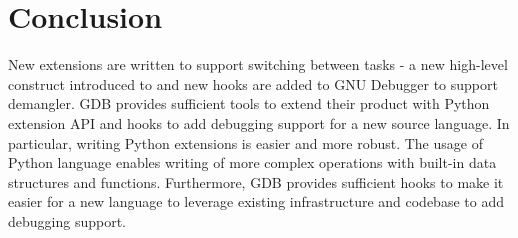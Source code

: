 \chapter{Conclusion}
New extensions are written to support switching between tasks - a new
high-level construct introduced to \uCPP and new hooks are added to GNU
Debugger to support \CFAS demangler. GDB provides sufficient tools to extend
their product with Python extension API and hooks to add debugging support for a
new source language. In particular, writing Python extensions is easier and more
robust. The usage of Python language enables writing of
more complex operations with built-in data structures and functions.
Furthermore, GDB provides sufficient hooks to make it easier for a new language to leverage existing
infrastructure and codebase to add debugging support.

